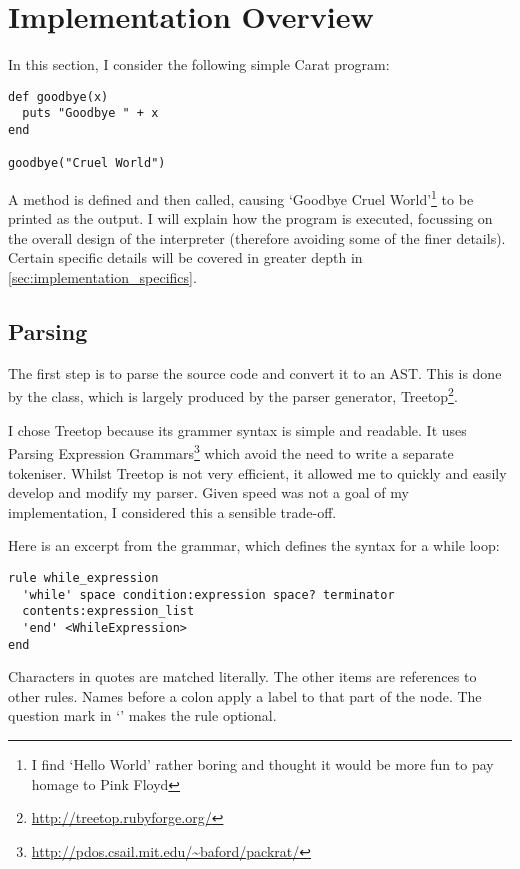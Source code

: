 \section{Implementation Overview}

In this section, I consider the following simple Carat program:

\begin{lstlisting}
def goodbye(x)
  puts "Goodbye " + x
end

goodbye("Cruel World")
\end{lstlisting}

A  method is defined and then called, causing `Goodbye Cruel World'\footnote{I find `Hello World' rather boring and thought it would be more fun to pay homage to Pink Floyd} to be printed as the output. I will explain how the program is executed, focussing on the overall design of the interpreter (therefore avoiding some of the finer details). Certain specific details will be covered in greater depth in \autoref{sec:implementation_specifics}.

\subsection{Parsing}

The first step is to parse the source code and convert it to an AST. This is done by the \-\- class, which is largely produced by the parser generator, Treetop\footnote{\url{http://treetop.rubyforge.org/}}.

I chose Treetop because its grammer syntax is simple and readable. It uses Parsing Expression Grammars\footnote{\url{http://pdos.csail.mit.edu/~baford/packrat/}} which avoid the need to write a separate tokeniser. Whilst Treetop is not very efficient, it allowed me to quickly and easily develop and modify my parser. Given speed was not a goal of my implementation, I considered this a sensible trade-off.

Here is an excerpt from the grammar, which defines the syntax for a while loop:

\begin{lstlisting}[language=treetop]
rule while_expression
  'while' space condition:expression space? terminator
  contents:expression_list
  'end' <WhileExpression>
end
\end{lstlisting}

Characters in quotes are matched literally. The other items are references to other rules. Names before a colon apply a label to that part of the node. The question mark in `' makes the rule optional.

